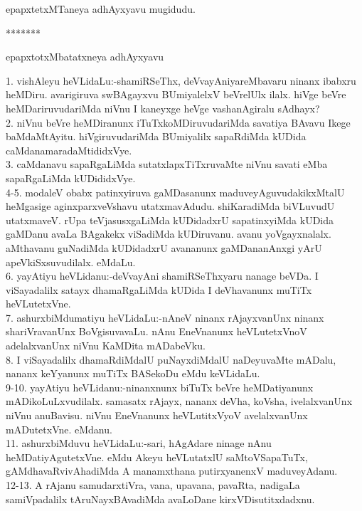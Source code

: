 \documentclass{article}
\begin{document}
\begin{center}
epapxtetxMTaneya adhAyxyavu mugidudu.
\end{center}

\begin{center}
*******
\end{center}

\begin{center}
epapxtotxMbatatxneya adhAyxyavu
\end{center}

1. vishAleyu heVLidaLu:-shamiRSeThx, deVvayAniyareMbavaru ninanx ibabxru heMDiru. avarigiruva swBAgayxvu BUmiyalelxV beVrelUlx ilalx. hiVge beVre heMDariruvudariMda niVnu I kaneyxge heVge vashanAgiralu sAdhayx?\\
2. niVnu beVre heMDiranunx iTuTxkoMDiruvudariMda savatiya BAvavu Ikege baMdaMtAyitu. hiVgiruvudariMda BUmiyalilx sapaRdiMda kUDida caMdanamaradaMtididxVye.\\
3. caMdanavu sapaRgaLiMda sutatxlapxTiTxruvaMte niVnu savati eMba sapaRgaLiMda kUDididxVye.\\
4-5. modaleV obabx patinxyiruva gaMDasanunx maduveyAguvudakikxMtalU heMgasige aginxparxveVshavu utatxmavAdudu. shiKaradiMda biVLuvudU utatxmaveV. rUpa teVjasusxgaLiMda kUDidadxrU sapatinxyiMda kUDida gaMDanu avaLa BAgakekx viSadiMda kUDiruvanu. avanu yoVgayxnalalx. aMthavanu guNadiMda kUDidadxrU avananunx gaMDananAnxgi yArU apeVkiSxsuvudilalx. eMdaLu.\\
6. yayAtiyu heVLidanu:-deVvayAni shamiRSeThxyaru nanage beVDa. I viSayadalilx satayx dhamaRgaLiMda kUDida I deVhavanunx muTiTx heVLutetxVne.\\
7. ashurxbiMdumatiyu heVLidaLu:-nAneV ninanx rAjayxvanUnx ninanx shariVravanUnx BoVgisuvavaLu. nAnu EneVnanunx heVLutetxVnoV adelalxvanUnx niVnu KaMDita mADabeVku.\\
8. I viSayadalilx dhamaRdiMdalU puNayxdiMdalU naDeyuvaMte mADalu, nananx keYyanunx muTiTx BASekoDu eMdu keVLidaLu.\\
9-10. yayAtiyu heVLidanu:-ninanxnunx biTuTx beVre heMDatiyanunx mADikoLuLxvudilalx. samasatx rAjayx, nananx deVha, koVsha, ivelalxvanUnx niVnu anuBavisu. niVnu EneVnanunx heVLutitxVyoV avelalxvanUnx mADutetxVne. eMdanu.\\
11. ashurxbiMduvu heVLidaLu:-sari, hAgAdare ninage nAnu heMDatiyAgutetxVne. eMdu Akeyu heVLutatxlU saMtoVSapaTuTx, gAMdhavaRvivAhadiMda A manamxthana putirxyanenxV maduveyAdanu.\\
12-13. A rAjanu samudarxtiVra, vana, upavana, pavaRta, nadigaLa samiVpadalilx tAruNayxBAvadiMda avaLoDane kirxVDisutitxdadxnu.\\
\end{document}
